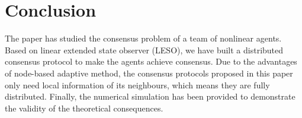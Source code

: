 \documentclass[english]{cccconf}
\begin{document}
\section{Conclusion}

The paper has studied the consensus problem of a team of nonlinear agents. Based on linear extended state observer (LESO), we have built a distributed consensus protocol to make the agents achieve consensus. Due to the advantages of node-based adaptive method, the consensus protocols proposed in this paper only need local information of its neighbours, which means they are fully distributed. Finally, the numerical simulation has been provided to demonstrate the validity of the theoretical consequences.




\end{document}
